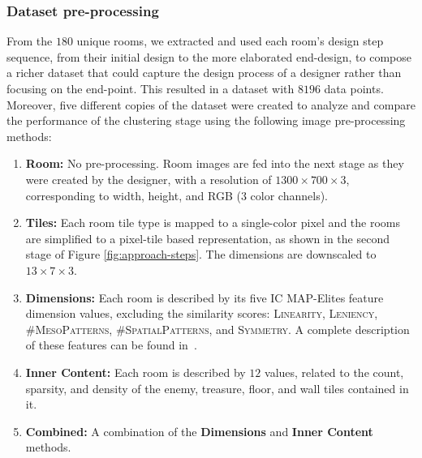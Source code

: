 \subsubsection{Dataset pre-processing}

From the $180$ unique rooms, we extracted and used each room's design step sequence, from their initial design to the more elaborated end-design, to compose a richer dataset that could capture the design process of a designer rather than focusing on the end-point. This resulted in a dataset with $8196$ data points. 
Moreover, five different copies of the dataset were created to analyze and compare the performance of the clustering stage using the following image pre-processing methods:
\begin{enumerate}
    \item \textbf{Room:} No pre-processing. Room images are fed into the next stage as they were created by the designer, with a resolution of $1300\times 700\times3$, corresponding to width, height, and RGB ($3$ color channels).
    
    \item \textbf{Tiles:} Each room tile type is mapped to a single-color pixel and the rooms are simplified to a pixel-tile based representation, as shown in the second stage of Figure \ref{fig:approach-steps}. The dimensions are downscaled to $13\times 7\times3$.
    
    \item \textbf{Dimensions:} Each room is described by its five IC MAP-Elites feature dimension values, excluding the similarity scores: \textsc{Linearity}, \textsc{Leniency}, \textsc{\#MesoPatterns}, \textsc{\#SpatialPatterns}, and \textsc{Symmetry}. A complete description of these features can be found in~.
    
    \item \textbf{Inner Content:} Each room is described by $12$ values, related to the count, sparsity, and density of the enemy, treasure, floor, and wall tiles contained in it.
    
    \item \textbf{Combined:} A combination of the \textbf{Dimensions} and \textbf{Inner Content} methods.
\end{enumerate}


